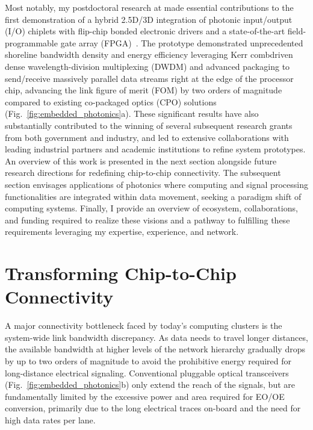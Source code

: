 Most notably, my postdoctoral research at \mySchoolShort{} made essential contributions to the first demonstration of a hybrid 2.5D/3D integration of photonic input/output (I/O) chiplets with
flip-chip bonded electronic drivers and a state-of-the-art field-programmable gate array (FPGA)~\cite{wangSiliconPhotonicsChip2024,wangCoDesignedSiliconPhotonics2024,RovinskiISCAS25}. The prototype demonstrated unprecedented shoreline bandwidth density and energy efficiency leveraging Kerr comb\textendash{}driven dense wavelength-division multiplexing (DWDM) and advanced packaging to send/receive massively parallel data streams right at the edge of the processor chip, advancing the link figure of merit (FOM) by two orders of magnitude compared to existing co-packaged optics (CPO) solutions (Fig.~\ref{fig:embedded_photonics}a). These significant results have also substantially contributed to the winning of several subsequent research grants from both government and industry, and led to extensive collaborations with leading industrial partners and academic institutions to refine system prototypes. An overview of this work is presented in the next section alongside future research directions for redefining chip-to-chip connectivity. The subsequent section envisages applications of photonics where computing and signal processing functionalities are integrated within data movement, seeking a paradigm shift of computing systems. Finally, I provide an overview of ecosystem, collaborations, and funding required to realize these visions and a pathway to fulfilling these requirements leveraging my expertise, experience, and network.

\section*{Transforming Chip-to-Chip Connectivity}

A major connectivity bottleneck faced by today's computing clusters is the system-wide link bandwidth discrepancy. As data needs to travel longer distances, the available bandwidth at higher levels of the network hierarchy gradually drops by up to two orders of magnitude to avoid the prohibitive energy required for long-distance electrical signaling. Conventional pluggable optical transceivers (Fig.~\ref{fig:embedded_photonics}b) only extend the reach of the signals, but are fundamentally limited by the excessive power and area required for EO/OE conversion, primarily due to the long electrical traces on-board and the need for high data rates per lane.


